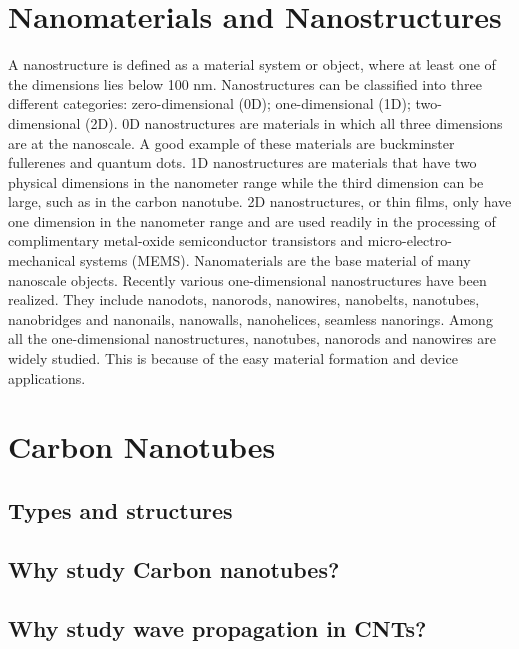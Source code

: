 \section {Nanomaterials and Nanostructures}
A nanostructure is defined as a material system or object, where
at least one of the dimensions lies below 100 nm. Nanostructures
can be classified into three different categories: zero-dimensional
(0D); one-dimensional (1D); two-dimensional (2D). 0D nanostructures are materials in which all three dimensions are at the nanoscale. A good example of these materials are buckminster fullerenes  and quantum dots. 1D nanostructures are materials that have two physical dimensions in the nanometer range while the third dimension can be large, such as in the carbon nanotube. 2D nanostructures, or thin films, only have one dimension
in the nanometer range and are used readily in the processing of complimentary metal-oxide semiconductor transistors and micro-electro-mechanical systems (MEMS). Nanomaterials are the base material of many nanoscale objects. Recently various one-dimensional nanostructures have been realized. They include nanodots, nanorods, nanowires, nanobelts, nanotubes, nanobridges and nanonails, nanowalls, nanohelices, seamless nanorings. Among all the one-dimensional nanostructures, nanotubes, nanorods and nanowires are widely studied. This is because of the easy material
formation and device applications.


\section {Carbon Nanotubes}
\subsection {Types and structures}
\subsection {Why study Carbon nanotubes?}
\subsection {Why study wave propagation in CNTs?}
